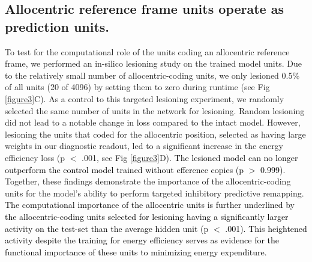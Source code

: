 \documentclass[10pt,letterpaper]{article}
\begin{document}
\subsection{Allocentric reference frame units operate as prediction units.}

To test for the computational role of the units coding an allocentric reference frame, we performed an in-silico lesioning study on the trained model units. Due to the relatively small number of allocentric-coding units, we only lesioned 0.5\% of all units (20 of 4096) by setting them to zero during runtime (see Fig \ref{figure3}C). As a control to this targeted lesioning experiment, we randomly selected the same number of units in the network for lesioning. Random lesioning did not lead to a notable change in loss compared to the intact model. However, lesioning the units that coded for the allocentric position, selected as having large weights in our diagnostic readout, led to a significant increase in the energy efficiency loss (p $<$ .001, see Fig \ref{figure3}D). \textcolor{black}{The lesioned model can no longer outperform the control model trained without efference copies (p $>$ 0.999)}. Together, these findings demonstrate the importance of the allocentric-coding units for the model's ability to perform targeted inhibitory predictive remapping.
\textcolor{black}{The computational importance of the allocentric units is further underlined by the allocentric-coding units selected for lesioning having a significantly larger activity on the test-set than the average hidden unit (p $<$ .001). This heightened activity despite the training for energy efficiency serves as evidence for the functional importance of these units to minimizing energy expenditure.}
\end{document}
